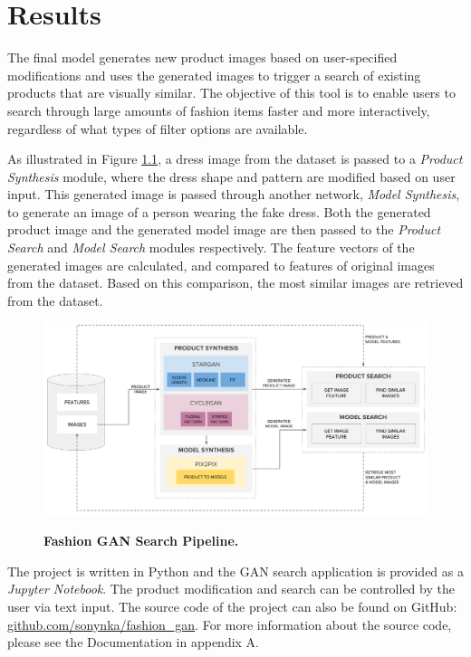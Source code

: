 \documentclass[12pt]{report}
\begin{document}
\chapter{Results}
The final model generates new product images based on user-specified modifications and uses the generated images to trigger a search of existing products that are visually similar. The objective of this tool is to enable users to search through large amounts of fashion items faster and more interactively, regardless of what types of filter options are available.

As illustrated in Figure \ref{fig:pipeline}, a dress image from the dataset is passed to a \textit{Product Synthesis} module, where the dress shape and pattern are modified based on user input. This generated image is passed through another network, \textit{Model Synthesis}, to generate an image of a person wearing the fake dress. Both the generated product image and the generated model image are then passed to the \textit{Product Search} and \textit{Model Search} modules respectively. The feature vectors of the generated images are calculated, and compared to features of original images from the dataset. Based on this comparison, the most similar images are retrieved from the dataset.

\vspace{0.5cm}
\begin{figure}[h]
\centering
{\includegraphics[width=\linewidth]{05_results/pipeline}}
\caption{\label{fig:pipeline} \textbf{Fashion GAN Search Pipeline.}}
\end{figure}

The project is written in Python and the GAN search application is provided as a \textit{Jupyter Notebook}. The product modification and search can be controlled by the user via text input. The source code of the project can also be found on GitHub: \linebreak \hyperlink{https://github.com/sonynka/fashion\_gan}{github.com/sonynka/fashion\_gan}. For more information about the source code, please see the Documentation in appendix A.
\end{document}
